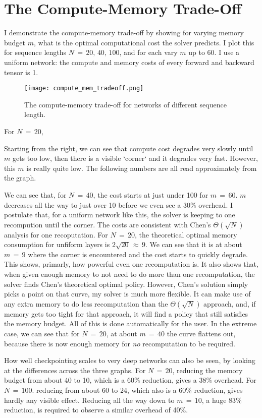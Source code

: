 \section{The Compute-Memory Trade-Off}
I demonstrate the compute-memory trade-off by showing for varying memory budget \(m\), what is the optimal computational cost the solver predicts.
I plot this for sequence lengths \(N\,=\, 20,\,40,\,100\), and for each vary \(m\) up to \(60\).
I use a uniform network: the compute and memory costs of every forward and backward tensor is 1.

\begin{figure}[h]
    \centering
    \texttt{[image: compute\_mem\_tradeoff.png]}
    \caption{The compute-memory trade-off for networks of different sequence length.}
    \label{fig:4-cm-tradeoff}
\end{figure}

For \(N\,=\,20\),

Starting from the right, we can see that compute cost degrades very slowly until \(m\) gets too low, then there is a visible `corner` and it degrades very fast.
However, this \(m\) is really quite low.
The following numbers are all read approximately from the graph.

We can see that, for \(N\,=\,40\), the cost starts at just under 100 for \(m\,=\,60\).
\(m\) decreases all the way to just over 10 before we even see a 30\% overhead.
I postulate that, for a uniform network like this, the solver is keeping to one recompution until the corner.
The costs are consistent with Chen's \(\Theta(\sqrt{N})\) analysis for one recoputation.
For \(N\,=\,20\), the theoretical optimal memory consumption for unfiform layers is \(2\sqrt{20}\,\approx\,9\).
We can see that it is at about \(m\,=\,9\) where the corner is encountered and the cost starts to quickly degrade.
This shows, primarly, how powerful even one recomputation is.
It also shows that, when given enough memory to not need to do more than one recomputation, the solver finds Chen's theoretical optimal policy.
However, Chen's solution simply picks a point on that curve, my solver is much more flexible.
It can make use of any extra memory to do less recomputation than the \(\Theta(\sqrt{N})\) approach, and, if memory gets too tight for that approach, it will find a policy that still satisfies the memory budget.
All of this is done automatically for the user.
In the extreme case, we can see that for \(N\,=\,20\), at about \(m\,=\,40\) the curve flattens out, because there is now enough memory for \textit{no} recomputation to be required.

How well checkpointing scales to very deep networks can also be seen, by looking at the differences across the three graphs.
For \(N\,=\,20\), reducing the memory budget from about 40 to 10, which is a 60\% reduction, gives a 38\% overhead.
For \(N\,=\,100\). reducing from about 60 to 24, which also is a 60\% reduction, gives hardly any visible effect.
Reducing all the way down to \(m\,=\,10\), a huge 83\% reduction, is required to observe a similar overhead of 40\%.
